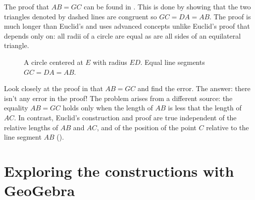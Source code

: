 \documentclass[11pt,a4paper]{article}
\begin{document}
The proof that $AB=GC$ can be found in \cite{rusty}. This is done by showing that the two triangles denoted by dashed lines are congruent so $GC=DA=AB$. The proof is much longer than Euclid's and uses advanced concepts unlike Euclid's proof that depends only on: all radii of a circle are equal as are all sides of an equilateral triangle.
\begin{figure}[H]
\begin{center}
\caption{A circle centered at $E$ with radius $ED$. Equal line segments $GC=DA=AB$.}\label{fig.rusty-3}
\end{center}
\end{figure}
\vspace*{-3ex}
Look closely at the proof in \cite{rusty} that $AB=GC$ and find the error. The answer: there isn't any error in the proof! The problem arises from a different source: the equality $AB=GC$ holds only when the length of $AB$ is less that the length of $AC$. In contrast, Euclid's construction and proof are true independent of the relative lengths of  $AB$ and $AC$, and of the position of the point $C$ relative to the line segment $AB$ (\cite{toussaint}).



\section{Exploring the constructions with GeoGebra}
\end{document}
